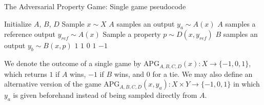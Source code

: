 \begin{algorithm}\label{alg:apg}
\caption{The Adversarial Property Game: Single game pseudocode}
\begin{algorithmic}[1]
\State Initialize $A$, $B$, $D$
\State Sample $x \sim X$
\State $A$ samples an output $y_a \sim A(x)$
\State $A$ samples a reference output $y_{ref} \sim A(x)$
\State Sample a property $p \sim D(x, y_{ref})$
\State $B$ samples an output $y_b \sim B(x, p)$
    \State \Return $1$ 
    \State \Return $1$ 
    \State \Return $0$ 
    \State \Return $1$ 
\Else
    \State \Return $-1$ 
\EndIf
\end{algorithmic}
\end{algorithm}

We denote the outcome of a single game by $\text{APG}_{A,B,C,D}(x): X \to \{-1, 0, 1\}$, which returns $1$ if $A$ wins, $-1$ if $B$ wins, and $0$ for a tie. We may also define an alternative version of the game $\text{APG}_{A,B,C,D}(x, y_a): X \times Y \to \{-1, 0, 1\}$ in which $y_a$ is given beforehand instead of being sampled directly from $A$.

